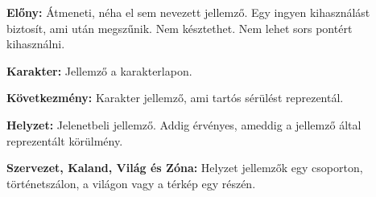 \begin{multicols*}{2}

\textbf{Előny:} Átmeneti, néha el sem nevezett jellemző. Egy ingyen kihasználást biztosít, ami után megszűnik. Nem késztethet. Nem lehet sors pontért kihasználni.

\textbf{Karakter:} Jellemző a karakterlapon.

\textbf{Következmény:} Karakter jellemző, ami tartós sérülést reprezentál.

\textbf{Helyzet:} Jelenetbeli jellemző. Addig érvényes, ameddig a jellemző által reprezentált körülmény.

\textbf{Szervezet, Kaland, Világ és Zóna:} Helyzet jellemzők egy csoporton, történetszálon, a világon vagy a térkép egy részén.

\end{multicols*}
